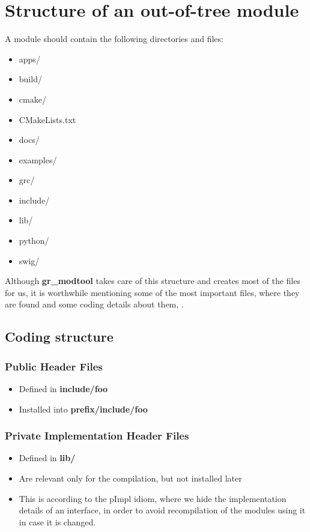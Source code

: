 
\section{Structure of an out-of-tree module}
\label{sec:struct-oot}

A module should contain the following directories and files:
\begin{itemize}
  \item apps/
	\item build/
  \item cmake/
  \item CMakeLists.txt
  \item docs/
  \item examples/
  \item grc/
  \item include/
  \item lib/
  \item python/
  \item swig/
\end{itemize}

Although \textbf{gr\_modtool} takes care of this structure and creates most of
the files for us, it is worthwhile mentioning some of the most important files,
where they are found and some coding details about them\cite{blocks},
\cite{oot-modules}.

\subsection{Coding structure}
\subsubsection*{Public Header Files}
\begin{itemize}
  \item Defined in \textbf{include/foo}
  \item Installed into \textbf{prefix/include/foo}
\end{itemize}

\subsubsection*{Private Implementation Header Files}
\begin{itemize}
  \item Defined in \textbf{lib/}
  \item Are relevant only for the compilation, but not installed later
  \item This is according to the pImpl idiom, where we hide the implementation details
of an interface, in order to avoid recompilation of the modules using it in case
it is changed\cite{pimpl}.
\end{itemize}

